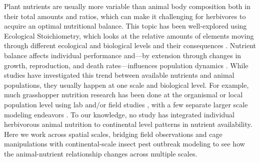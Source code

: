 \documentclass[
]{article}
\begin{document}
Plant nutrients are usually more variable than animal body composition
both in their total amounts and ratios, which can make it challenging
for herbivores to acquire an optimal nutritional balance. This topic has
been well-explored using Ecological Stoichiometry, which looks at the
relative amounts of elements moving through different ecological and
biological levels and their consequences \citep{elser_nutritional_2000}.
Nutrient balance affects individual performance
\citep{batzli_nutritional_1986, bernays_dietary_1994} and---by extension
through changes in growth, reproduction, and death rates---influences
population dynamics \citep{elser_nutritional_2000}. While studies have
investigated this trend between available nutrients and animal
populations, they usually happen at one scale and biological level. For
example, much grasshopper nutrition research has been done at the
organismal or local population level using lab and/or field studies
\citep{behmer_insect_2009, cease_how_2024, le_gall_global_2019}, with a
few separate larger scale modeling endeavors
\citep[\citet{welti_nutrient_2020}]{zhou_increased_2019}. To our
knowledge, no study has integrated individual herbivorous animal
nutrition to continental level patterns in nutrient availability. Here
we work across spatial scales, bridging field observations and cage
manipulations with continental-scale insect pest outbreak modeling to
see how the animal-nutrient relationship changes across multiple scales.
\end{document}

